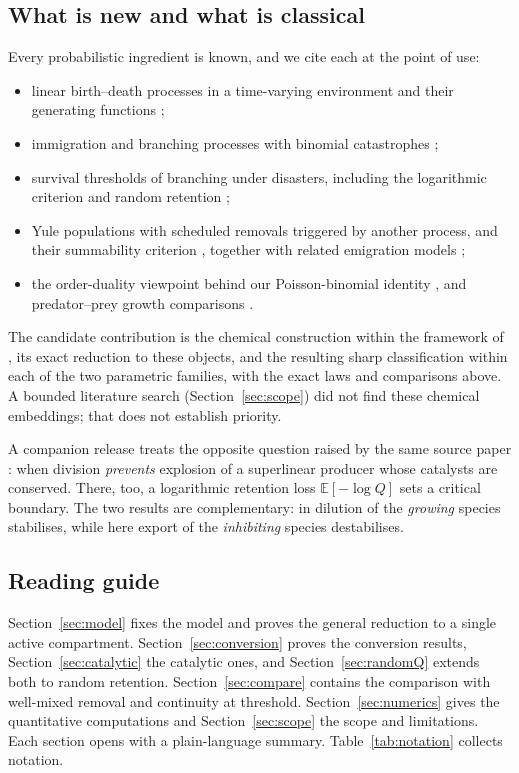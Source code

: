 \documentclass[11pt,a4paper]{article}
\numberwithin{equation}{section}
\theoremstyle{definition}\newtheorem{definition}[theorem]{Definition}
\theoremstyle{remark}\newtheorem{remark}[theorem]{Remark}\newtheorem{example}[theorem]{Example}
\newcommand{\E}{\mathbb E}
\begin{document}
\subsection{What is new and what is classical}\label{sec:contribution}
Every probabilistic ingredient is known, and we cite each at the point of use:
\begin{itemize}
\item linear birth--death processes in a time-varying environment and their generating functions \cite{Kendall1948,BacaerEdDarraz2014};
\item immigration and branching processes with binomial catastrophes \cite{BrockwellGaniResnick1982,Economou2004,KapodistriaPhungDucResing2016,BenAriRoitershteinSchinazi2019,GalloRoldanCorrea2026};
\item survival thresholds of branching under disasters, including the logarithmic criterion and random retention \cite{KaplanSudburyNilsen1975,BansayePardoSmadi2013,HermannPfaffelhuber2020};
\item Yule populations with scheduled removals triggered by another process, and their summability criterion \cite{LeskelaRobertSimatos2009}, together with related emigration models \cite{Pakes1989,Braun2022};
\item the order-duality viewpoint behind our Poisson-binomial identity \cite{Siegmund1976,AsmussenSigman1996}, and predator--prey growth comparisons \cite{Coffey1995}.
\end{itemize}
The candidate contribution is the chemical construction within the framework of \cite{AHRLL2026}, its exact reduction to these objects, and the resulting sharp classification within each of the two parametric families, with the exact laws and comparisons above. A bounded literature search (Section~\ref{sec:scope}) did not find these chemical embeddings; that does not establish priority.

A companion release \cite{EP2026companion} treats the opposite question raised by the same source paper \cite[Conjecture~3.14]{AHRLL2026}: when division \emph{prevents} explosion of a superlinear producer whose catalysts are conserved. There, too, a logarithmic retention loss $\E[-\log Q]$ sets a critical boundary. The two results are complementary: in \cite{EP2026companion} dilution of the \emph{growing} species stabilises, while here export of the \emph{inhibiting} species destabilises.

\subsection{Reading guide}
Section~\ref{sec:model} fixes the model and proves the general reduction to a single active compartment. Section~\ref{sec:conversion} proves the conversion results, Section~\ref{sec:catalytic} the catalytic ones, and Section~\ref{sec:randomQ} extends both to random retention. Section~\ref{sec:compare} contains the comparison with well-mixed removal and continuity at threshold. Section~\ref{sec:numerics} gives the quantitative computations and Section~\ref{sec:scope} the scope and limitations. Each section opens with a plain-language summary. Table~\ref{tab:notation} collects notation.
\end{document}
